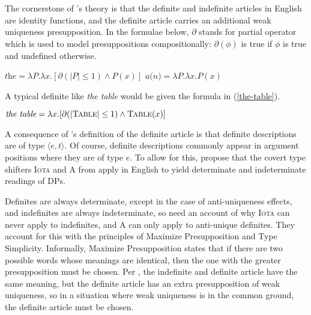 \section{\citet{cb2015} \label{coppock-beaver}}
The cornerstone of \citeauthor{cb2015}'s theory is that the definite and indefinite articles in English are identity functions, and the definite article carries an additional weak uniqueness presupposition. In the formulae below, $\partial$ stands for  partial operator which is used to model presuppositions compositionally: $\partial(\phi)$ is true if $\phi$ is true and undefined otherwise.

\begin{exe}
	\ex $\textit{the} = \lambda P . \lambda x . [\partial(|P| \le 1) \land P(x)]$
	\ex $\textit{a(n)} = \lambda P . \lambda x . P(x)$
\end{exe}

A typical definite like \textit{the table} would be given the formula in (\ref{the-table}).

\begin{exe}
	\ex \label{the-table} $\textit{the table} = \lambda x . [ \partial(|\textsc{Table}| \le 1) \land \textsc{Table}(x) ]$
\end{exe}

A consequence of \citeauthor{cb2015}'s definition of the definite article is that definite descriptions are of type $\langle e, t \rangle$. Of course, definite descriptions commonly appear in argument positions where they are of type $e$. To allow for this, \citeauthor{cb2015} propose that the covert type shifters \textsc{Iota} and \textsc{A} from \citet{partee86} apply in English to yield determinate and indeterminate readings of DPs.

Definites are always determinate, except in the case of anti-uniqueness effects, and indefinites are always indeterminate, so \citeauthor{cb2015} need an account of why \textsc{Iota} can never apply to indefinites, and \textsc{A} can only apply to anti-unique definites. They account for this with the principles of Maximize Presupposition and Type Simplicity. Informally, Maximize Presupposition states that if there are two possible words whose meanings are identical, then the one with the greater presupposition must be chosen. Per \citeauthor{cb2015}, the indefinite and definite article have the same meaning, but the definite article has an extra presupposition of weak uniqueness, so in a situation where weak uniqueness is in the common ground, the definite article must be chosen.

